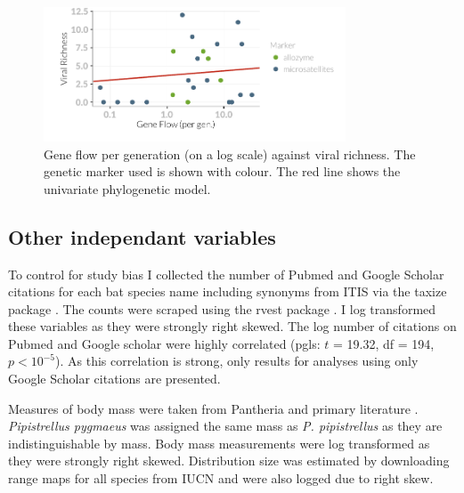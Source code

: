 \begin{knitrout}\footnotesize
{}\color{fgcolor}\begin{figure}[t]

{\centering \includegraphics[width=0.8\textwidth]{figure/fstRawData-1} 

}

\caption[Gene flow per generation (on a log scale) against viral richness]{Gene flow per generation (on a log scale) against viral richness. The genetic marker used is shown with colour. The red line shows the univariate phylogenetic model.}\label{fig:fstRawData}
\end{figure}


\end{knitrout}

\subsection{Other independant variables}

To control for study bias I collected the number of Pubmed and Google Scholar citations for each bat species name including synonyms from ITIS \cite{itis} via the taxize package \cite{chamberlain2013taxize}.
The counts were scraped using the rvest package \cite{rvest}.
I log transformed these variables as they were strongly right skewed.
The log number of citations on Pubmed and Google scholar were highly correlated (pgls: $t$ = 19.32, df = 194, $p < 10^{-5}$).
As this correlation is strong, only results for analyses using only Google Scholar citations are presented.

Measures of body mass were taken from Pantheria \cite{jones2009pantheria} and primary literature \cite{canals2005relative, arita1993rarity, lopez2014echolocation, orr2013does, lim2001bat, aldridge1987turning, ma2003dietary, owen2003home, henderson2008movements, heaney2012nyctalus, oleksy2015high, zhang2009recent}. 
\emph{Pipistrellus pygmaeus} was assigned the same mass as \emph{P. pipistrellus} as they are indistinguishable by mass.
Body mass measurements were log transformed as they were strongly right skewed.
Distribution size was estimated by downloading range maps for all species from IUCN \cite{iucn} and were also logged due to right skew.



